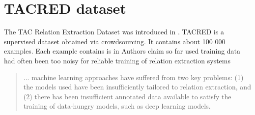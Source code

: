 \section{TACRED dataset}
The TAC Relation Extraction Dataset was introduced in \cite{zhang2017tacred}. TACRED is a supervised dataset obtained via crowdsourcing. It contains about 100 000 examples. Each example contains  is in  Authors claim so far used training data had often been too noisy for reliable training of relation extraction systems


\begin{quotation}
... machine learning approaches have suffered from two key problems: (1) the models used have been insufficiently tailored to relation extraction, and (2) there has been insufficient annotated data available to satisfy the training of data-hungry models, such as deep learning models.
\end{quotation} 
